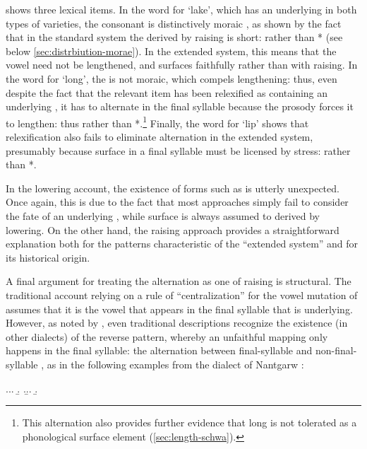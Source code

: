  shows three lexical items. In the word for `lake', which has an underlying  in both types of varieties, the consonant is distinctively moraic \citep{moren01:_distin}, as shown by the fact that in the standard system the \ipa{[i]} derived by raising is short: \ipa{[ˈɬin]} rather than *\ipa{[ɬiːn]} (see below \cref{sec:distrbiution-morae}). In the extended system, this means that the vowel need not be lengthened, and surfaces faithfully rather than with raising. In the word for `long', the \ipa{[r]} is not moraic, which compels lengthening: thus, even despite the fact that the relevant item has been relexified as containing an underlying , it has to alternate in the final syllable because the prosody forces it to lengthen: thus \ipa{[ˈhiːr]} rather than *\ipa{[həːr]}.\footnote{This alternation also provides further evidence that long \ipa{[əː]} is not tolerated as a phonological surface element (\cf \cref{sec:length-schwa}).} Finally, the word for `lip' shows that relexification also fails to eliminate alternation in the extended system, presumably because surface \ipa{[ə]} in a final syllable must be licensed by stress: \ipa{[ˈɡweːvis]} rather than *\ipa{[ˈɡweːvəs]}.

In the lowering account, the existence of forms such as \ipa{[ˈɬən]} is utterly unexpected. Once again, this is due to the fact that most approaches simply fail to consider the fate of an underlying \ipa{[ə]}, while surface \ipa{[ə]} is always assumed to derived by lowering. On the other hand, the raising approach provides a straightforward explanation both for the patterns characteristic of the \enquote{extended system} and for its historical origin.

A final argument for treating the alternation as one of raising is structural. The traditional account relying on a rule of \enquote{centralization} for the vowel mutation of \ipa{[i]} assumes that it is the vowel that appears in the final syllable that is underlying. However, as noted by \citet{welshphonotactics}, even traditional descriptions recognize the existence (in other dialects) of the reverse pattern, whereby an unfaithful mapping only happens in the final syllable: the alternation between final\hyp syllable \ipa{[a]} and non\hyp final\hyp syllable \ipa{[e]}, as in the following examples from the dialect of Nantgarw \citep{thomas93:_tafod_nantg}:

\ex.\a.\a.
\b.
\z.\b.\a.
\b.

